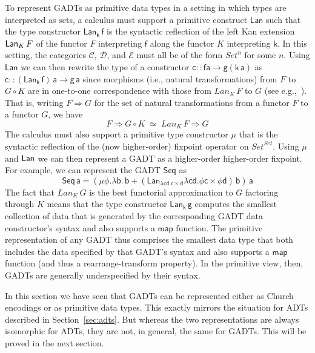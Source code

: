 \documentclass[acmsmall,screen,review,anonymous]{acmart}
\theoremstyle{definition}
\begin{document}
To represent GADTs as primitive data types in a setting in which types
are interpreted as sets, a calculus must support a primitive construct
$\mathsf{Lan}$ such that the type constructor $\mathsf{Lan_k\,f}$ is
the syntactic reflection of the left Kan extension $\mathsf{Lan}_K \,F$ of the
functor $F$ interpreting $\mathsf{f}$ along the functor $K$
interpreting $\mathsf{k}$. In this setting, the categories
$\mathcal{C}$, $\mathcal{D}$, and $\mathcal{E}$ must all be of the
form $\mathit{Set}^n$ for some $n$. Using $\mathsf{Lan}$ we can then
rewrite the type of a constructor $\mathsf{c :: f a \to g(k\,a)}$ as
$\mathsf{c :: (Lan_k\,f)\,a \to g\,a}$ since morphisms (i.e., natural
transformations) from $F$ to $G \circ K$ are in one-to-one
correspondence with those from $\mathit{Lan}_K\,F$ to $G$ (see
e.g.,~\cite{rie16}). That is, writing $F \Rightarrow G$ for the set of
natural transformations from a functor $F$ to a functor $G$, we have
\begin{equation}\label{eq:nat-transfs}
F \Rightarrow G \circ K\; \simeq \; Lan_K\,F \Rightarrow G
\end{equation}
The calculus must also support a primitive type
constructor $\mathsf{\mu}$ that is the syntactic reflection of the
(now higher-order) fixpoint operator on
$\mathit{Set}^\mathit{Set}$. Using $\mu$ and $\mathsf{Lan}$ we can then
represent a GADT as a higher-order higher-order fixpoint. For example,
we can represent the GADT $\mathsf{Seq}$ as
\[\mathsf{Seq\,a} = \mathsf{(\mu \phi.\lambda b.\, b + (Lan_{\lambda c
    d. c \times d} \lambda c d. \phi c \times \phi d)\,b)\,a}\] The
fact that $Lan_K\,G$ is the best functorial approximation to $G$
factoring through $K$ means that the type constructor
$\mathsf{Lan_k\,g}$ computes the smallest collection of data that is
generated by the corresponding GADT data constructor's syntax and also
supports a $\mathsf{map}$ function. The primitive representation of
any GADT thus comprises the smallest data type that both includes the
data specified by that GADT's syntax and also supports a
$\mathsf{map}$ function (and thus a rearrange-transform property). In
the primitive view, then, GADTs are generally underspecified by their
syntax.

\vspace*{0.05in}

In this section we have seen that GADTs can be represented either as
Church encodings or as primitive data types. This exactly mirrors the
situation for ADTs described in Section~\ref{sec:adts}. But whereas
the two representations are always isomorphic for ADTs, they are not,
in general, the same for GADTs. This will be proved in the next
section.
\end{document}
